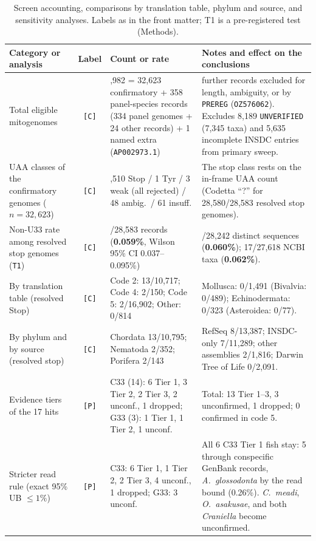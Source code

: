 \documentclass[11pt, a4paper]{article}
\begin{document}
\begin{table}[htbp]
\centering
\footnotesize
\setlength{\tabcolsep}{4pt}
\renewcommand{\arraystretch}{1.2}
\caption{Screen accounting, comparisons by translation table, phylum and source, and sensitivity analyses. Labels as in the front matter; T1 is a pre-registered test (Methods).}\label{tab:summary}
\begin{tabularx}{\textwidth}{
  >{\raggedright\arraybackslash}p{4.0cm}
  c
  >{\raggedright\arraybackslash}p{4.3cm}
  >{\raggedright\arraybackslash}X
}
\toprule
\textbf{Category or analysis} & \textbf{Label} & \textbf{Count or rate} & \textbf{Notes and effect on the conclusions} \\
\midrule
Total eligible mitogenomes & \texttt{[C]} & 32,982 = 32,623 confirmatory + 358 panel-species records (334 panel genomes + 24 other records) + 1 named extra (\texttt{AP002973.1}) & 98 further records excluded for length, ambiguity, or by \texttt{PREREG} (\texttt{OZ576062}). Excludes 8,189 \texttt{UNVERIFIED} (7,345 taxa) and 5,635 incomplete INSDC entries from primary sweep. \\
UAA classes of the confirmatory genomes ($n = 32,623$) & \texttt{[C]} & 32,510 Stop / 1 Tyr / 3 weak (all rejected) / 48 ambig.\ / 61 insuff. & The stop class rests on the in-frame UAA count (Codetta ``?'' for 28,580/28,583 resolved stop genomes). \\
Non-U33 rate among resolved stop genomes (\texttt{T1}) & \texttt{[C]} & 17/28,583 records (\textbf{0.059\%}, Wilson 95\% CI 0.037--0.095\%) & 17/28,242 distinct sequences (\textbf{0.060\%}); 17/27,618 NCBI taxa (\textbf{0.062\%}). \\
By translation table (resolved Stop) & \texttt{[C]} & Code 2: 13/10,717; Code 4: 2/150; Code 5: 2/16,902; Other: 0/814 & Mollusca: 0/1,491 (Bivalvia: 0/489); Echinodermata: 0/323 (Asteroidea: 0/77). \\
By phylum and by source (resolved stop) & \texttt{[C]} & Chordata 13/10,795; Nematoda 2/352; Porifera 2/143 & RefSeq 8/13,387; INSDC-only 7/11,289; other assemblies 2/1,816; Darwin Tree of Life 0/2,091. \\
Evidence tiers of the 17 hits & \texttt{[P]} & C33 (14): 6 Tier 1, 3 Tier 2, 2 Tier 3, 2 unconf., 1 dropped; G33 (3): 1 Tier 1, 1 Tier 2, 1 unconf. & Total: 13 Tier 1--3, 3 unconfirmed, 1 dropped; 0 confirmed in code 5. \\
Stricter read rule (exact 95\% UB $\le 1\%$) & \texttt{[P]} & C33: 6 Tier 1, 1 Tier 2, 2 Tier 3, 4 unconf., 1 dropped; G33: 3 unconf. & All 6 C33 Tier 1 fish stay: 5 through conspecific GenBank records, \textit{A.\ glossodonta} by the read bound (0.26\%). \textit{C.\ meadi}, \textit{O.\ asakusae}, and both \textit{Craniella} become unconfirmed. \\

\end{tabularx}
\end{table}
\end{document}
